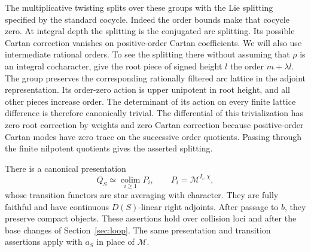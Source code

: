 The multiplicative twisting splits over these groups with the Lie
splitting specified by the standard cocycle.  Indeed the order bounds
make that cocycle zero.  At integral depth the splitting is the
conjugated arc splitting.  Its possible Cartan correction vanishes on
positive-order Cartan coefficients.  We will also use intermediate
rational orders.  To see the splitting there without assuming that
\(\rho\) is an integral cocharacter, give the root piece of signed height
\(l\) the order \(m+\lambda l\).  The group preserves the corresponding
rationally filtered arc lattice in the adjoint representation.  Its
order-zero action is upper unipotent in root height, and all other
pieces increase order.  The determinant of its action on every finite
lattice difference is therefore canonically trivial.  The differential
of this trivialization has zero root correction by weights and zero
Cartan correction because positive-order Cartan modes have zero trace
on the successive order quotients.  Passing through the finite
nilpotent quotients gives the asserted splitting.

\begin{proposition}\label{walg:adolescent}
There is a canonical presentation
\begin{equation}\label{eq:L5}
 Q_S\simeq\underset{i\geq1}{\operatorname{colim}}P_i,
 \qquad P_i=\mathcal M^{I_i,\chi},
\end{equation}
whose transition functors are star averaging with character.  They are
fully faithful and have continuous \(D(S)\)-linear right adjoints.
After passage to \(b\), they preserve compact objects.  These
assertions hold over collision loci and after the base changes of Section~\ref{sec:loop}.
The same presentation and transition assertions apply with
\(a_S\) in place of \(\mathcal M\).
\end{proposition}

